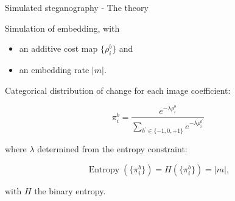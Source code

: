 \documentclass[10pt,aspectratio=169]{beamer}
\begin{document}
\begin{frame}{Simulated steganography - The theory}




Simulation of embedding, with
\begin{itemize}
    \item an additive cost map $\{\rho_i^b\}$ and 
    \item an embedding rate $|m|$. 
\end{itemize}

\pause 

Categorical distribution of change for each image coefficient:

\begin{equation}
\pi_{i}^b =\frac{e^{-\lambda \rho_{i}^{b}}}{\sum_{b^{\prime} \in \{-1,0,+1\}} e^{-\lambda \rho_{i}^{b^{\prime}}}}
\end{equation}

\pause
where $\lambda$ determined from the entropy constraint:

\begin{equation}
\operatorname{Entropy}(\{\pi_i^b\}) = H(\{\pi_i^b\}) = |m|,
\end{equation}

with $H$ the binary entropy.



\end{frame}
\end{document}
